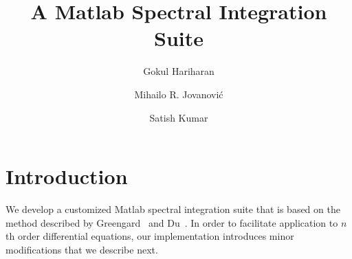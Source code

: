 \documentclass[%
secnumarabic,%
 amssymb, amsmath,%
 aps,prf,superscriptaddress,longbibliography
frontmatterverbose,
]{revtex4-2}
\begin{document}
\title{\bf \large A Matlab Spectral Integration Suite}


\author{Gokul Hariharan}
\author{Mihailo R. Jovanovi\'c}
\author{Satish Kumar}

\newcommand{\D}{\mathrm D}
\newcommand{\I}{\mathbf I}
\newcommand{\J}{\mathbf J}
\newcommand{\K}{\mathbf K}
\newcommand{\E}{\mathbf E}
\newcommand{\0}{\mathbf 0}
\newcommand{\T}{\mathbf T}
\newcommand{\R}{\mathbf R}
\newcommand{\DD}[2]{\frac{\partial^2 #1}{\partial #2^2}}
\newcommand{\BB}[1]{\boldsymbol #1}
\newcommand{\hh}[1]{\mathbf{\bar{\text{$#1$}}}}
\newcommand{\HH}[1]{\mathbf{#1}}
\newcommand{\MM}[1]{\mathcal{#1}}
\newcommand{\MMbf}[1]{\mathbfcal{#1}}
\pagebreak
\begin{abstract}

\end{abstract}
\maketitle
\section{Introduction}\label{sec:intro}
We develop a customized Matlab spectral integration suite that is based on the method described by Greengard~\cite{GreSIAM91} and Du~\cite{DuSIAM2016}. In order to facilitate application to $n$th order differential equations, our implementation introduces minor modifications that we describe next. 
\end{document}
